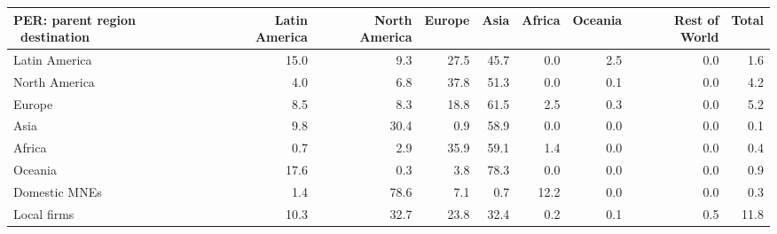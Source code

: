 \begin{tabular}{lrrrrrrrr}
\toprule
PER: parent region \ destination & Latin America & North America & Europe & Asia & Africa & Oceania & Rest of World & Total \\
\midrule
Latin America & 15.0 & 9.3 & 27.5 & 45.7 & 0.0 & 2.5 & 0.0 & 1.6 \\
North America & 4.0 & 6.8 & 37.8 & 51.3 & 0.0 & 0.1 & 0.0 & 4.2 \\
Europe & 8.5 & 8.3 & 18.8 & 61.5 & 2.5 & 0.3 & 0.0 & 5.2 \\
Asia & 9.8 & 30.4 & 0.9 & 58.9 & 0.0 & 0.0 & 0.0 & 0.1 \\
Africa & 0.7 & 2.9 & 35.9 & 59.1 & 1.4 & 0.0 & 0.0 & 0.4 \\
Oceania & 17.6 & 0.3 & 3.8 & 78.3 & 0.0 & 0.0 & 0.0 & 0.9 \\
Domestic MNEs & 1.4 & 78.6 & 7.1 & 0.7 & 12.2 & 0.0 & 0.0 & 0.3 \\
Local firms & 10.3 & 32.7 & 23.8 & 32.4 & 0.2 & 0.1 & 0.5 & 11.8 \\
\bottomrule
\end{tabular}
